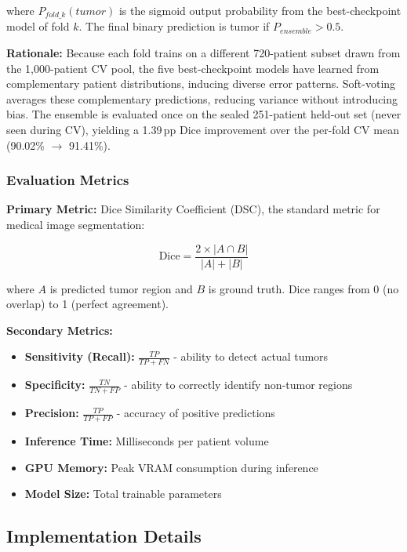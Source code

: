 \documentclass{article}
\begin{document}
where $P_{fold\_k}(tumor)$ is the sigmoid output probability from the best-checkpoint model of fold $k$. The final binary prediction is tumor if $P_{ensemble} > 0.5$.

\textbf{Rationale:} Because each fold trains on a different 720-patient subset drawn from the 1,000-patient CV pool, the five best-checkpoint models have learned from complementary patient distributions, inducing diverse error patterns. Soft-voting averages these complementary predictions, reducing variance without introducing bias. The ensemble is evaluated once on the sealed 251-patient held-out set (never seen during CV), yielding a 1.39\,pp Dice improvement over the per-fold CV mean (90.02\% $\rightarrow$ 91.41\%).

\subsubsection{Evaluation Metrics}

\textbf{Primary Metric:} Dice Similarity Coefficient (DSC), the standard metric for medical image segmentation:

\begin{equation}
\text{Dice} = \frac{2 \times |A \cap B|}{|A| + |B|}
\end{equation}

where $A$ is predicted tumor region and $B$ is ground truth. Dice ranges from 0 (no overlap) to 1 (perfect agreement).

\textbf{Secondary Metrics:}
\begin{itemize}
    \item \textbf{Sensitivity (Recall):} $\frac{TP}{TP + FN}$ - ability to detect actual tumors
    \item \textbf{Specificity:} $\frac{TN}{TN + FP}$ - ability to correctly identify non-tumor regions
    \item \textbf{Precision:} $\frac{TP}{TP + FP}$ - accuracy of positive predictions
    \item \textbf{Inference Time:} Milliseconds per patient volume
    \item \textbf{GPU Memory:} Peak VRAM consumption during inference
    \item \textbf{Model Size:} Total trainable parameters
\end{itemize}


\subsection{Implementation Details}
\end{document}
